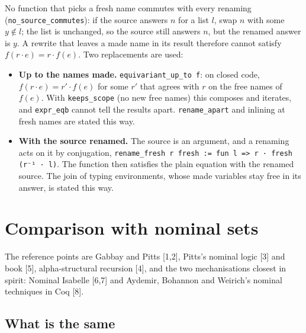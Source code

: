 \documentclass[10pt,a4paper]{article}
\newcommand\code[1]{\texttt{#1}}
\begin{document}
No function that picks a fresh name commutes with every renaming
(\code{no\_source\_commutes}): if the source answers $n$ for a list $l$, swap
$n$ with some $y \notin l$; the list is unchanged, so the source still answers
$n$, but the renamed answer is $y$. A rewrite that leaves a made name in its
result therefore cannot satisfy $f(r\cdot e) = r\cdot f(e)$. Two replacements
are used:

\begin{itemize}[leftmargin=1.2em,itemsep=0.2em,topsep=0.2em]
\item \textbf{Up to the names made.} \code{equivariant\_up\_to f}: on closed
  code, $f(r\cdot e) = r'\cdot f(e)$ for some $r'$ that agrees with $r$ on the
  free names of $f(e)$. With \code{keeps\_scope} (no new free names) this
  composes and iterates, and \code{expr\_eqb} cannot tell the results apart.
  \code{rename\_apart} and inlining at fresh names are stated this way.
\item \textbf{With the source renamed.} The source is an argument, and a
  renaming acts on it by conjugation, \code{rename\_fresh r fresh := fun l =>
  r · fresh (r⁻¹ · l)}. The function then satisfies the plain equation with
  the renamed source. The join of typing environments, whose made variables
  stay free in its answer, is stated this way.
\end{itemize}

\section{Comparison with nominal sets}

The reference points are Gabbay and Pitts [1,2], Pitts's nominal logic [3] and
book [5], alpha-structural recursion [4], and the two mechanisations closest
in spirit: Nominal Isabelle [6,7] and Aydemir, Bohannon and Weirich's nominal
techniques in Coq [8].

\subsection{What is the same}
\end{document}
